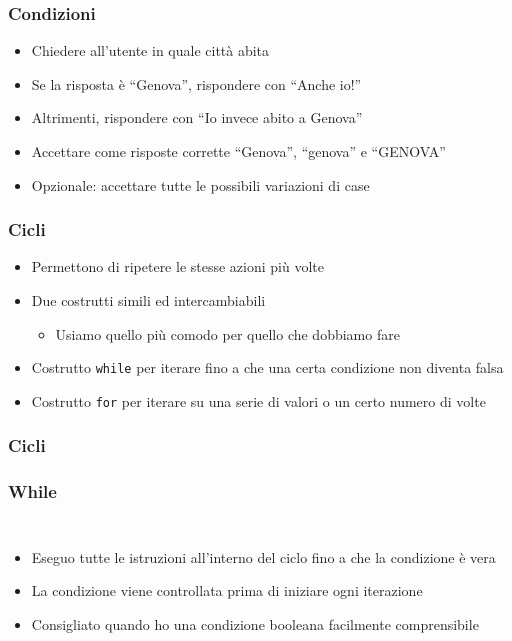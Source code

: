 \begin{exerciseframe}
    \frametitle{Condizioni}

    \begin{itemize}
        \item Chiedere all'utente in quale città abita
        \item Se la risposta è ``Genova'', rispondere con ``Anche io!''
        \item Altrimenti, rispondere con ``Io invece abito a Genova''

        \pause
        \bigskip
        \item Accettare come risposte corrette ``Genova'', ``genova'' e ``GENOVA''
        
        \pause
        \bigskip
        \item Opzionale: accettare tutte le possibili variazioni di case
    \end{itemize}
\end{exerciseframe}

\begin{contentframe}
    \frametitle{Cicli}

    \begin{itemize}
        \item Permettono di ripetere le stesse azioni più volte

        \bigskip
        \item Due costrutti simili ed intercambiabili
        \begin{itemize}
            \item Usiamo quello più comodo per quello che dobbiamo fare
        \end{itemize}
        
        \bigskip
        \item Costrutto \texttt{while} per iterare fino a che una certa condizione non diventa falsa
        \item Costrutto \texttt{for} per iterare su una serie di valori o un certo numero di volte
    \end{itemize}
\end{contentframe}

\begin{contentframe}
    \frametitle{Cicli}
    \frametitle{While}

    \begin{columns}
        \begin{itemize}
            \item Eseguo tutte le istruzioni all'interno del ciclo fino a che la condizione è vera
            \item La condizione viene controllata prima di iniziare ogni iterazione

            \bigskip
            \item Consigliato quando ho una condizione booleana facilmente comprensibile
        \end{itemize}
        
        \centering
    \end{columns}
\end{contentframe}

